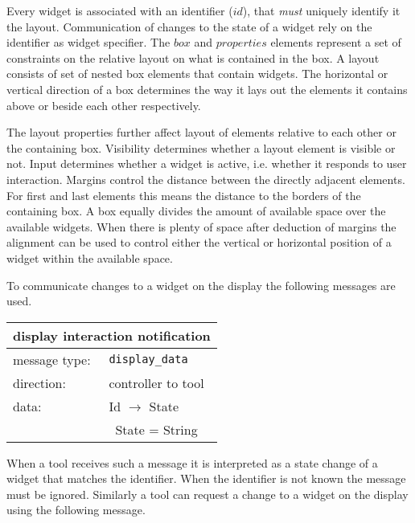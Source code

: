 \documentclass{article}
\newcommand{\msg}[1]{\texttt{#1}}
\begin{document}
   \vspace{-0.4cm}
   \noindent Every widget is associated with an identifier ($id$), that
   \emph{must} uniquely identify it the layout. Communication of changes to the
   state of a widget rely on the identifier as widget specifier.  The $box$ and
   $properties$ elements represent a set of constraints on the relative layout
   on what is contained in the box. A layout consists of set of nested box
   elements that contain widgets.  The horizontal or vertical direction of a
   box determines the way it lays out the elements it contains above or beside
   each other respectively.

   The layout properties further affect layout of elements relative to each
   other or the containing box. Visibility determines whether a layout element
   is visible or not. Input determines whether a widget is active, i.e.
   whether it responds to user interaction. Margins control the distance
   between the directly adjacent elements. For first and last elements this
   means the distance to the borders of the containing box. A box equally
   divides the amount of available space over the available widgets. When
   there is plenty of space after deduction of margins the alignment can be
   used to control either the vertical or horizontal position of a widget 
   within the available space.

   To communicate changes to a widget on the display the following messages
   are used.

   \begin{table}[H]
    \begin{center}
     \begin{tabular}{|ll|}
      \hline
       \multicolumn{2}{|l|}{\textbf{display interaction notification}} \\
      \hline
       message type:   & \msg{display\_data} \\
      \hline
       direction:      & controller to tool \\
       data:           & Id $\rightarrow$ State \\
                       & \ State = String \\
      \hline
     \end{tabular}
    \end{center}
   \vspace{-0.4cm}
   \end{table}

   \noindent When a tool receives such a message it is interpreted as a state
   change of a widget that matches the identifier. When the identifier is not
   known the message must be ignored. Similarly a tool can request a change to
   a widget on the display using the following message.
\end{document}

